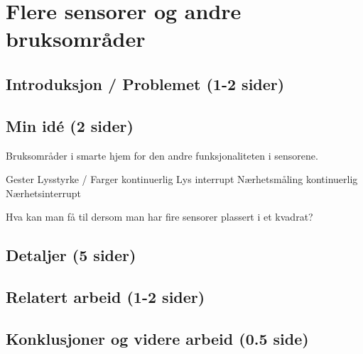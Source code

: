 \section{Flere sensorer og andre bruksområder}
\subsection{Introduksjon / Problemet (1-2 sider)}

\subsection{Min idé (2 sider)}
Bruksområder i smarte hjem for den andre funksjonaliteten i sensorene.

Gester
Lysstyrke / Farger kontinuerlig
Lys interrupt
Nærhetsmåling kontinuerlig
Nærhetsinterrupt

Hva kan man få til dersom man har fire sensorer plassert i et kvadrat?



\subsection{Detaljer (5 sider)}

\subsection{Relatert arbeid (1-2 sider)}

\subsection{Konklusjoner og videre arbeid (0.5 side)}
